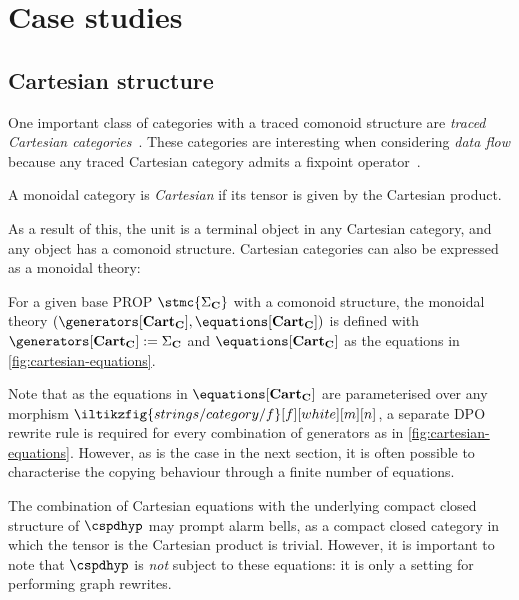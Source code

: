 \section{Case studies}

\subsection{Cartesian structure}

One important class of categories with a traced comonoid structure are
\emph{traced Cartesian categories}~\cite{cazanescu1990new,hasegawa1997recursion}.
These categories are interesting when considering \emph{data flow} because any
traced Cartesian category admits a fixpoint
operator~\cite[Thm. 3.1]{hasegawa1997recursion}.

\begin{definition}
    A monoidal category is \emph{Cartesian} if its tensor is given by the
    Cartesian product.
\end{definition}

As a result of this, the unit is a terminal object in any Cartesian category,
and any object has a comonoid structure.
Cartesian categories can also be expressed as a monoidal theory:

\begin{definition}
    For a given base PROP \(\stmc{\Sigma_\mathbf{C}}\) with a comonoid
    structure, the monoidal theory \((
        \generators[\mathbf{Cart}_\mathbf{C}],
        \equations[\mathbf{Cart}_\mathbf{C}]
    )\) is defined with \(
        \generators[\mathbf{Cart}_\mathbf{C}] := \Sigma_\mathbf{C}
    \) and \(
        \equations[\mathbf{Cart}_\mathbf{C}]
    \) as the equations in \cref{fig:cartesian-equations}.
\end{definition}

Note that as the equations in \(\equations[\mathbf{Cart}_\mathbf{C}]\) are
parameterised over any morphism
\(\iltikzfig{strings/category/f}[f][white][m][n]\), a separate
DPO rewrite rule is required for every combination of generators as in
\cref{fig:cartesian-equations}.
However, as is the case in the next section, it is often possible to
characterise the copying behaviour through a finite number of equations.

\begin{remark}
    The combination of Cartesian equations with the underlying compact closed
    structure of \(\cspdhyp\) may prompt alarm bells, as a compact closed
    category in which the tensor is the Cartesian product is trivial.
    However, it is important to note that \(\cspdhyp\) is \emph{not} subject to
    these equations: it is only a setting for performing graph
    rewrites.
\end{remark}

